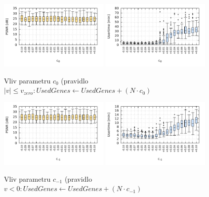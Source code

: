 {
\captionsetup{aboveskip=0pt}

\begin{figure}[h]
    \centering
    \includegraphics[width=0.475\textwidth]{fig/plot/tuningabs-zeroinc-30kg-psnr.pdf}
    \includegraphics[width=0.475\textwidth]{fig/plot/tuningabs-zeroinc-30kg-utime.pdf}
    \caption{Vliv parametru $c_{0}$ (pravidlo $\left|v\right| \leq v_\mathit{zero}: \mathit{UsedGenes} \leftarrow \mathit{UsedGenes} + \left(N \cdot c_0\right)$}
\end{figure}

\begin{figure}[h]
    \centering
    \includegraphics[width=0.475\textwidth]{fig/plot/tuningabs-decrinc-30kg-psnr.pdf}
    \includegraphics[width=0.475\textwidth]{fig/plot/tuningabs-decrinc-30kg-utime.pdf}
    \caption{Vliv parametru $c_{-1}$ (pravidlo $v < 0: \mathit{UsedGenes} \leftarrow \mathit{UsedGenes} + \left(N \cdot c_{-1}\right)$}
\end{figure}

}
